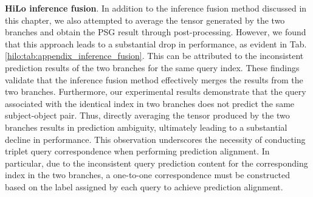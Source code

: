 \textbf{HiLo inference fusion}.
In addition to the inference fusion method discussed in this chapter, we also attempted to average the tensor generated by the two branches and obtain the PSG result through post-processing.
However, we found that this approach leads to a substantial drop in performance, as evident in Tab. \ref{hilo:tab:appendix_inference_fusion}.
This can be attributed to the inconsistent prediction results of the two branches for the same query index.
These findings validate that the inference fusion method effectively merges the results from the two branches.
%
Furthermore, our experimental results demonstrate that the query associated with the identical index in two branches does not predict the same subject-object pair.
Thus, directly averaging the tensor produced by the two branches results in prediction ambiguity, ultimately leading to a substantial decline in performance.
This observation underscores the necessity of conducting triplet query correspondence when performing prediction alignment.
In particular, due to the inconsistent query prediction content for the corresponding index in the two branches, a one-to-one correspondence must be constructed based on the label assigned by each query to achieve prediction alignment.

\begin{table}[t]
    \centering
    \caption{Ablation study for inference fusion.
    \textit{Inference fusion} refers to the method proposed in this chapter to fuse the results of two branches.
    \textit{Average tensor} refers to the fusion method that directly averages the tensor output by the two branches.
    The \textit{average tensor} causes the performance to drop significantly.
    }
    \label{hilo:tab:appendix_inference_fusion}
\end{table}



